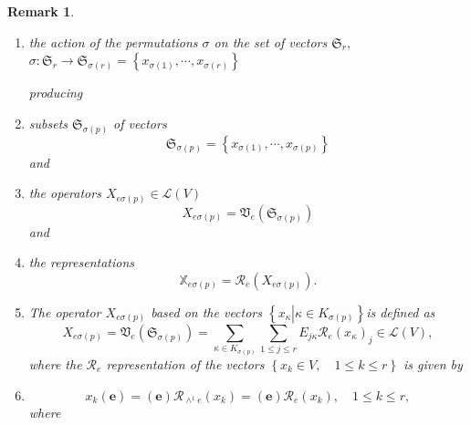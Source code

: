 \documentclass[aps,preprint]{revtex4}%
\newtheorem{remark}[theorem]{Remark}
\begin{document}
\begin{remark}
\begin{enumerate}
\item the action of the permutations $\sigma$ on the set of vectors
$\mathfrak{S}_{r},$ $\sigma:\mathfrak{S}_{r}\rightarrow\mathfrak{S}%
_{\sigma\left(  r\right)  }=\left\{  x_{\sigma\left(  1\right)  }%
,\cdots,x_{\sigma\left(  r\right)  }\right\}  $

producing

\item subsets $\mathfrak{S}_{\sigma\left(  p\right)  }$ of vectors
\begin{equation}
\mathfrak{S}_{\sigma\left(  p\right)  }=\left\{  x_{\sigma\left(  1\right)
},\cdots,x_{\sigma\left(  p\right)  }\right\}
\end{equation}
and

\item the operators $X_{e\sigma\left(  p\right)  }\in\mathcal{L}\left(
V\right)  $%
\begin{equation}
X_{e\sigma\left(  p\right)  }=\mathfrak{V}_{e}\left(  \mathfrak{S}%
_{\sigma\left(  p\right)  }\right)
\end{equation}
and

\item the representations
\begin{equation}
\mathbb{X}_{e\sigma\left(  p\right)  }=\mathcal{R}_{e}\left(  X_{e\sigma
\left(  p\right)  }\right)  .
\end{equation}


\item The operator $X_{e\sigma\left(  p\right)  }$ based on the vectors
$\left\{  x_{\kappa}\left\vert \kappa\in K_{\sigma\left(  p\right)  }\right.
\right\}  $is defined as
\begin{equation}
X_{e\sigma\left(  p\right)  }=\mathfrak{V}_{e}\left(  \mathfrak{S}%
_{\sigma\left(  p\right)  }\right)  =\sum_{\kappa\in K_{\sigma\left(
p\right)  }}\sum_{1\leq j\leq r}E_{j\kappa}\mathcal{R}_{e}\left(  x_{\kappa
}\right)  _{j}\in\mathcal{L}\left(  V\right)  ,
\end{equation}
where the $\mathcal{R}_{e}$ representation of the vectors $\left\{  x_{k}\in
V,\quad1\leq k\leq r\right\}  $ is given by

\item
\begin{equation}
x_{k}\left(  \mathbf{e}\right)  =\left(  \mathbf{e}\right)  \mathcal{R}%
_{\wedge^{1}e}\left(  x_{k}\right)  =\left(  \mathbf{e}\right)  \mathcal{R}%
_{e}\left(  x_{k}\right)  ,\quad1\leq k\leq r,
\end{equation}
where


\end{enumerate}
\end{remark}
\end{document}
